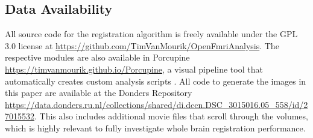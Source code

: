 \subsection{Data Availability}
All source code for the registration algorithm is freely available under the GPL 3.0 license at \url{https://github.com/TimVanMourik/OpenFmriAnalysis}. The respective modules are also available in Porcupine \url{https://timvanmourik.github.io/Porcupine}, a visual pipeline tool that automatically creates custom analysis scripts \cite{VanMourik2017}. All code to generate the images in this paper are available at the Donders Repository \url{https://data.donders.ru.nl/collections/shared/di.dccn.DSC_3015016.05_558/id/27015532}. This also includes additional movie files that scroll through the volumes, which is highly relevant to fully investigate whole brain registration performance. 



